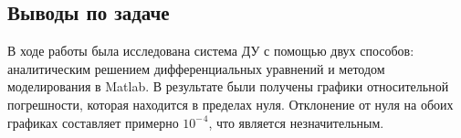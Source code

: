 \documentclass[12pt]{article}
\begin{document}
		\subsection{Выводы по задаче}
		
	В ходе работы была исследована система ДУ с помощью двух способов: аналитическим решением дифференциальных уравнений и методом моделирования в Matlab. В результате были получены графики относительной погрешности, которая находится в пределах нуля. Отклонение от нуля на обоих графиках составляет примерно ${10^-}^4$, что является незначительным.	
	
	\newpage 
		
\end{document}
